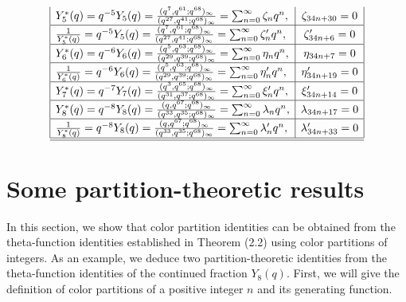 \documentclass[11pt,a4paper]{article}
\numberwithin{equation}{section}
\theoremstyle{plain}
\begin{document}
\[\begin{array}{|l|c|}
		{Y_5^*(q)} = q^{-5} Y_5(q)
		= \frac{(q^{7}, q^{61}; q^{68})_\infty}{(q^{27}, q^{41}; q^{68})_\infty}
		= \sum_{n=0}^{\infty} \zeta_n q^n,
		& \zeta_{34n+30} = 0 \\ 
		\hline
		
		
		\frac{1}{{Y}_5^*(q)} = q^{-5} Y_5(q)
		= \frac{(q^{7}, q^{61}; q^{68})_\infty}{(q^{27}, q^{41}; q^{68})_\infty}
		= \sum_{n=0}^{\infty} \zeta'_n q^n,
		& \zeta'_{34n+6} = 0 \\ 
        \hline
		
		{Y_6^*(q)} = q^{-6} Y_6(q)
		= \frac{(q^{5}, q^{63}; q^{68})_\infty}{(q^{29}, q^{39}; q^{68})_\infty}
		= \sum_{n=0}^{\infty} \eta_n q^n,
		& \eta_{34n+7} = 0 \\ 
		\hline
		
		
		\frac{1}{{Y}_6^*(q)} = q^{-6} Y_6(q)
		= \frac{(q^{5}, q^{63}; q^{68})_\infty}{(q^{29}, q^{39}; q^{68})_\infty}
		= \sum_{n=0}^{\infty} \eta'_n q^n,
		& \eta'_{34n+19} = 0 \\ 
		\hline
		
		{Y_7^*(q)} = q^{-7} Y_7(q)
		= \frac{(q^{3}, q^{65}; q^{68})_\infty}{(q^{31}, q^{37}; q^{68})_\infty}
		= \sum_{n=0}^{\infty} \xi'_n q^n,
		& \xi'_{34n+14} = 0 \\ 
		\hline
		
		{Y_8^*(q)} = q^{-8} Y_8(q)
		= \frac{(q, q^{67}; q^{68})_\infty}{(q^{33}, q^{35}; q^{68})_\infty}
		= \sum_{n=0}^{\infty} \lambda_n q^n,
		& \lambda_{34n+17} = 0 \\ 
		\hline
		
		
		\frac{1}{{Y}_8^*(q)} = q^{-8} Y_8(q)
		= \frac{(q, q^{67}; q^{68})_\infty}{(q^{33}, q^{35}; q^{68})_\infty}
		= \sum_{n=0}^{\infty} \lambda'_n q^n,
		& \lambda'_{34n+33} = 0 \\ 
		\hline
		\hline
		
	\end{array}
	\]
    \section{Some partition-theoretic results}\label{s4}
	
	In this section, we show that color partition identities can be obtained from the theta-function identities
	established in Theorem (2.2) using color partitions of integers. As an example, we deduce two partition-theoretic
	identities from the theta-function identities of the continued fraction $Y_8(q)$. First, we will give the definition of color
	partitions of a positive integer $n$ and its generating function.
	
\end{document}
